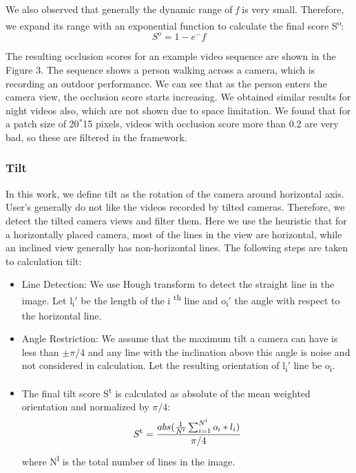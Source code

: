 \documentclass{sig-alternate-05-2015}
\begin{document}
We also observed that generally the dynamic range of \textit{f} is very small. Therefore, we expand its range with an exponential function to calculate the final score S\textsuperscript{o}:
\begin{equation}
S^o = 1 - e^-f
\end{equation}

The resulting occlusion scores for an example video sequence
are shown in the Figure 3. The sequence shows a person walking
across a camera, which is recording an outdoor performance. We
can see that as the person enters the camera view, the occlusion
score starts increasing. We obtained similar results for night videos
also, which are not shown due to space limitation. We found that
for a patch size of 20$^*$15 pixels, videos with occlusion score more
than 0.2 are very bad, so these are filtered in the framework.


\subsubsection{Tilt}
In this work, we define tilt as the rotation of the camera around
horizontal axis. User's generally do not like the videos recorded
by tilted cameras. Therefore, we detect the tilted camera views
and filter them. Here we use the heuristic that for a horizontally
placed camera, most of the lines in the view are horizontal, while
an inclined view generally has non-horizontal lines. The following
steps are taken to calculation tilt:
\begin{itemize}
\item Line Detection: We use Hough transform to detect the straight
line in the image. Let l\textsubscript{i}$'$ be the length of the i \textsuperscript{th} line and o\textsubscript{i}$'$
the angle with respect to the horizontal line. 
\item Angle Restriction: We assume that the maximum tilt a camera can have is less than $\pm\pi/4$ and any line with the inclination above this angle is noise and not considered in calculation. Let the resulting orientation of l\textsubscript{i}$'$ line be o\textsubscript{i}.
\item The final tilt score S\textsuperscript{t} is calculated as absolute of the mean
weighted orientation and normalized by $\pi/4$:
\begin{equation}
S\textsuperscript{t}=\frac{  abs(\frac{1}{N^l}\sum_{i=1}^{N^l} o_i \ast l_i) }{ \pi/4 }
\end{equation}
where N\textsuperscript{l} is the total number of lines in the image.
\end{itemize}
\end{document}
